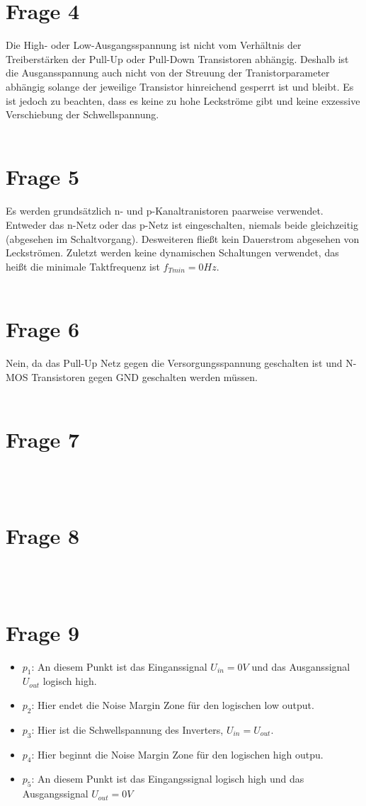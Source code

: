 \documentclass[a4paper]{scrartcl}
\begin{document}
\section*{Frage 4}
Die High- oder Low-Ausgangsspannung ist nicht vom Verhältnis der Treiberstärken der Pull-Up oder Pull-Down Transistoren abhängig. Deshalb ist die Ausgansspannung auch nicht von der Streuung der Tranistorparameter abhängig solange der jeweilige Transistor hinreichend gesperrt ist und bleibt. Es ist jedoch zu beachten, dass es keine zu hohe Leckströme gibt und keine exzessive Verschiebung der Schwellspannung.
~\\
~\\
\section*{Frage 5}
Es werden grundsätzlich n- und p-Kanaltranistoren paarweise verwendet. Entweder das n-Netz oder das p-Netz ist eingeschalten, niemals beide gleichzeitig (abgesehen im Schaltvorgang). Desweiteren fließt kein Dauerstrom abgesehen von Leckströmen. Zuletzt werden keine dynamischen Schaltungen verwendet, das heißt die minimale Taktfrequenz ist $f_{Tmin} = 0 Hz$.
~\\
~\\
\section*{Frage 6}
Nein, da das Pull-Up Netz gegen die Versorgungsspannung geschalten ist und N-MOS Transistoren gegen GND geschalten werden müssen.
~\\
~\\
\section*{Frage 7}

~\\
~\\
\section*{Frage 8}

~\\
~\\
\section*{Frage 9}
\begin{itemize}
	\item $p_1$: An diesem Punkt ist das Einganssignal $U_{in} = 0V$ und das Ausganssignal $U_{out}$ logisch high.
	\item $p_2$: Hier endet die Noise Margin Zone für den logischen low output.
	\item $p_3$: Hier ist die Schwellspannung des Inverters, $U_{in} = U_{out}$.
	\item $p_4$: Hier beginnt die Noise Margin Zone für den logischen high outpu.
	\item $p_5$: An diesem Punkt ist das Eingangssignal logisch high und das Ausgangssignal $U_{out} = 0V$
\end{itemize}
~\\
~\\
\end{document}

